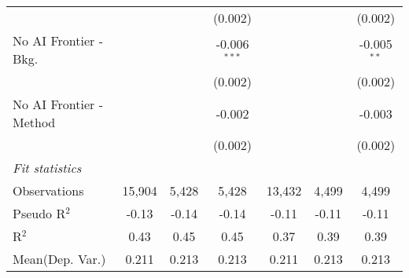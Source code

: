 \begin{tabular}{lcccccc}
                           &          &         & (0.002)        &         &              & (0.002)\\   
   No AI Frontier - Bkg.   &          &         & -0.006$^{***}$ &         &              & -0.005$^{**}$\\   
                           &          &         & (0.002)        &         &              & (0.002)\\   
   No AI Frontier - Method &          &         & -0.002         &         &              & -0.003\\   
                           &          &         & (0.002)        &         &              & (0.002)\\   
   \midrule
   \emph{Fit statistics}\\
   Observations            & 15,904   & 5,428   & 5,428          & 13,432  & 4,499        & 4,499\\  
   Pseudo R$^2$            & -0.13    & -0.14   & -0.14          & -0.11   & -0.11        & -0.11\\  
   R$^2$                   & 0.43     & 0.45    & 0.45           & 0.37    & 0.39         & 0.39\\  
Mean(Dep. Var.) & 0.211 & 0.213 & 0.213 & 0.211 & 0.213 & 0.213 \\
   

\end{tabular}
